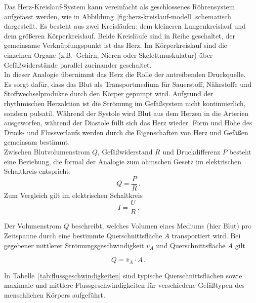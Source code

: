 \documentclass[
	german,%
	accentcolor=3d,%
	type=intern, %
	marginpar=false,%
]{tudapub}
\begin{document}
   Das Herz-Kreislauf-System kann vereinfacht als geschlossenes Röhrensystem aufgefasst werden, wie in Abbildung~\ref{fig:herz-kreislauf-modell} schematisch dargestellt. Es besteht aus zwei Kreisläufen: dem kleineren Lungenkreislauf und dem größeren Körperkreislauf. Beide Kreisläufe sind in Reihe geschaltet, der gemeinsame Verknüpfungspunkt ist das Herz. Im Körperkreislauf sind die einzelnen Organe (z.B.\ Gehirn, Nieren oder Skelettmuskulatur) über Gefäßwiderstände parallel zueinander geschaltet. 
   \\
   In dieser Analogie übernimmt das Herz die Rolle der antreibenden Druckquelle. Es sorgt dafür, dass das Blut als Transportmedium für Sauerstoff, Nährstoffe und Stoffwechselprodukte durch den Körper gepumpt wird. Aufgrund der rhythmischen Herzaktion ist die Strömung im Gefäßsystem nicht kontinuierlich, sondern pulsatil. Während der Systole wird Blut aus dem Herzen in die Arterien ausgeworfen, während der Diastole füllt sich das Herz wieder. Form und Höhe des Druck- und Flussverlaufs werden durch die Eigenschaften von Herz und Gefäßen gemeinsam bestimmt.
   \\
   Zwischen Blutvolumenstrom \(Q\), Gefäßwiderstand \(R\) und Druckdifferenz \(P\) besteht eine Beziehung, die formal der Analogie zum ohmschen Gesetz im elektrischen Schaltkreis entspricht:
   \[
      Q = \frac{P}{R} \, .
   \]
   Zum Vergleich gilt im elektrischen Schaltkreis
   \[
      I = \frac{U}{R} \, .
   \]

   Der Volumenstrom \(Q\) beschreibt, welches Volumen eines Mediums (hier Blut) pro Zeitspanne durch eine bestimmte Querschnittsfläche \(A\) transportiert wird. Bei gegebener mittlerer Strömungsgeschwindigkeit \(\bar{v}_A\) und Querschnittsfläche \(A\) gilt
   
   \begin{equation}
      Q = \bar{v}_A \cdot A \, .
      \label{eq:volumenstrom}
   \end{equation}

   In Tabelle~\ref{tab:flussgeschwindigkeiten} sind typische Querschnittsflächen sowie maximale und mittlere Flussgeschwindigkeiten für verschiedene Gefäßtypen des menschlichen Körpers aufgeführt.
\end{document}
